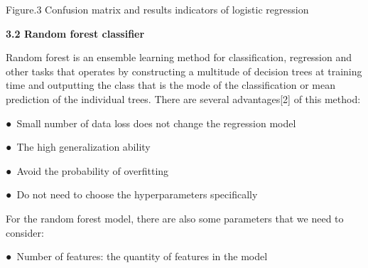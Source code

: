 \documentclass[12pt]{article}
\begin{document}

\par

\begin{Center}
{\fontsize{8pt}{9.6pt}\selectfont Figure.3 Confusion matrix and results indicators of logistic regression\par}
\end{Center}\par


\vspace{\baselineskip}
\textbf{3.2 Random forest classifier}\par

\begin{justify}
Random forest is an ensemble learning method for classification, regression and other tasks that operates by constructing a multitude of decision trees at training time and outputting the class that is the mode of the classification or mean prediction of the individual trees. There are several advantages​[2] of this method:
\end{justify}\par

\begin{justify}
●\  Small number of data loss does not change the regression model
\end{justify}\par

\begin{justify}
●\  The high generalization ability
\end{justify}\par

\begin{justify}
●\  Avoid the probability of overfitting
\end{justify}\par

\begin{justify}
●\  Do not need to choose the hyperparameters specifically
\end{justify}\par

\begin{justify}
For the random forest model, there are also some parameters that we need to consider:
\end{justify}\par

\begin{justify}
●\  Number of features: the quantity of features in the model
\end{justify}\par
\end{document}
